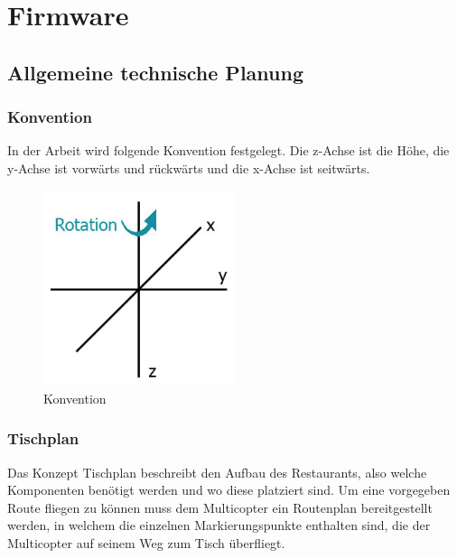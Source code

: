 \chapter{Firmware}
\renewcommand{\kapitelautor}{Autor: Christina Bornberg}

\section{Allgemeine technische Planung}

  \subsection{Konvention}
  In der Arbeit wird folgende Konvention festgelegt. Die z-Achse ist die Höhe, die y-Achse ist vorwärts und rückwärts und die x-Achse ist seitwärts.

  \begin{figure}[H]
    \begin{centering}
      \includegraphics[width = 0.5\textwidth]{Bilder/bor_konvention}
    \par\end{centering}
    \caption{Konvention}
    \label{Konvention}
  \end{figure}

  \subsection{Tischplan}
  Das Konzept Tischplan beschreibt den Aufbau des Restaurants, also welche Komponenten benötigt werden und wo diese platziert sind.
  Um eine vorgegeben Route fliegen zu können muss dem Multicopter ein Routenplan bereitgestellt werden, in welchem die einzelnen Markierungspunkte enthalten sind, die der Multicopter auf seinem Weg zum Tisch überfliegt.

